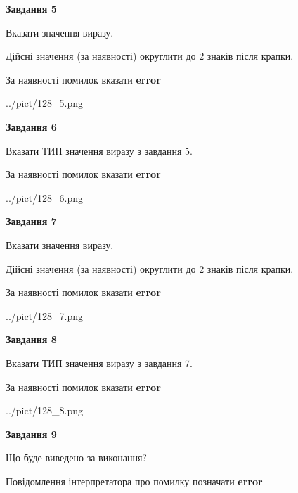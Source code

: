 \documentclass[11pt, ukrainian]{article}
\begin{document}
{\begin {large}
{\begin {center}\textbf{Завдання 5}\end {center}}\par
Вказати значення виразу. \par
Дійсні значення (за наявності) округлити до 2 знаків після крапки. \par
За наявності помилок вказати \textbf{error}

\begin{center}
	{../pict/128_5.png}
\end{center}
\newpage

{\begin {center}\textbf{Завдання 6}\end {center}}\par
Вказати ТИП значення виразу з завдання 5. \par
За наявності помилок вказати \textbf{error}

\begin{center}
	{../pict/128_6.png}
\end{center}
\newpage

{\begin {center}\textbf{Завдання 7}\end {center}}\par
Вказати значення виразу. \par
Дійсні значення (за наявності) округлити до 2 знаків після крапки. \par
За наявності помилок вказати \textbf{error}

\begin{center}
	{../pict/128_7.png}
\end{center}
\newpage

{\begin {center}\textbf{Завдання 8}\end {center}}\par
Вказати ТИП значення виразу з завдання 7. \par
За наявності помилок вказати \textbf{error}

\begin{center}
	{../pict/128_8.png}
\end{center}
\newpage

{\begin {center}\textbf{Завдання 9}\end {center}}\par
Що буде виведено за виконання? \par
Повідомлення інтерпретатора про помилку позначати \textbf{error}


\end{large}}
\end{document}
